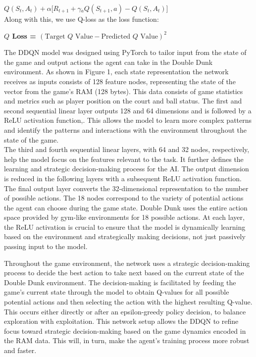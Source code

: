 \documentclass[letterpaper, 10 pt, conference]{ieeeconf}
\begin{document}
\textbf{ $Q(S_t, A_t) + \alpha[R_{t+1} + \gamma $$_a{Q(S_{t+1}, a)} - Q(S_t, A_t)]$} \\

\noindent Along with this, we use Q-loss as the loss function:
\begin{center}
    \textbf{$Q$ Loss = $(\text{Target $Q$ Value} - \text{Predicted $Q$ Value})^2$}
\end{center} 
\vspace{.5cm}
The DDQN model was designed using PyTorch to tailor input from the state of the game and output actions the agent can take in the Double Dunk environment. As shown in Figure 1, each state representation the network receives as inputs consists of 128 feature nodes, representing the state of the vector from the game’s RAM (128 bytes). This data consists of game statistics and metrics such as player position on the court and ball status. The first and second sequential linear layer outputs 128 and 64 dimensions and is followed by a ReLU activation function,. This allows the model to learn more complex patterns and identify the patterns and interactions with the environment throughout the state of the game. \\

The third and fourth sequential linear layers, with 64 and 32 nodes, respectively, help the model focus on the features relevant to the task. It further defines the learning and strategic decision-making process for the AI. The output dimension is reduced in the following layers with a subsequent ReLU activation function. The final output layer converts the 32-dimensional representation to the number of possible actions. The 18 nodes correspond to the variety of potential actions the agent can choose during the game state. Double Dunk uses the entire action space provided by gym-like environments for 18 possible actions. At each layer, the ReLU activation is crucial to ensure that the model is dynamically learning based on the environment and strategically making decisions, not just passively passing input to the model. \\


\vspace{.6cm} 

Throughout the game environment, the network uses a strategic decision-making process to decide the best action to take next based on the current state of the Double Dunk environment. The decision-making is facilitated by feeding the game's current state through the model to obtain Q-values for all possible potential actions and then selecting the action with the highest resulting Q-value. This occurs either directly or after an epsilon-greedy policy decision, to balance exploration with exploitation. This network setup allows the DDQN to refine focus toward strategic decision-making based on the game dynamics encoded in the RAM data. This will, in turn, make the agent's training process more robust and faster.
\end{document}

